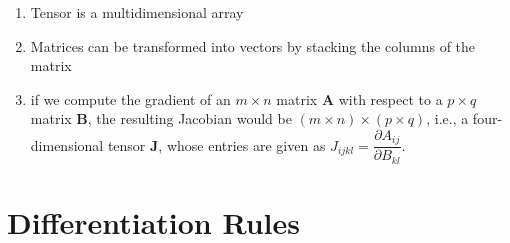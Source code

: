\begin{enumerate}
    \item 
    \begin{definition}[Tensor]
        Tensor is a multidimensional array
        \hfill \cite{mfml/book/mml/Deisenroth-Faisal-Ong}
    \end{definition}

    \item 
    \begin{definition}
        Matrices can be transformed into vectors by stacking the columns of the matrix
        \hfill \cite{mfml/book/mml/Deisenroth-Faisal-Ong}
    \end{definition}

    \item if we compute the gradient of an $m \times  n$ matrix $\bm{A}$ with respect to a $p \times  q$ matrix $\bm{B}$, the resulting Jacobian would be $(m\times n)\times (p\times q)$, i.e., a four-dimensional tensor $\bm{J}$, whose entries are given as $J_{ijkl} = \dfrac{\partial A_{ij}}{\partial B_{kl}}$.
    \hfill \cite{mfml/book/mml/Deisenroth-Faisal-Ong}
\end{enumerate}










\section{Differentiation Rules}

